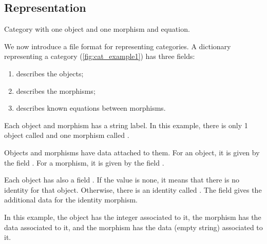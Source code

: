 \vfill
\begin{widepar}
\end{widepar}
\vfill

\clearpage

\subsection{Representation}

\begin{marginfigure}
    \caption{Category with one object and one morphism and equation.}
\end{marginfigure}

We now introduce a file format for representing categories.
A dictionary representing a category (\cref{fig:cat_example1}) has three fields:
\begin{enumerate}
    \item {} describes the objects;
    \item {} describes the morphisms;
    \item {} describes known equations between morphisms.
\end{enumerate}
Each object and morphism has a string label.
In this example, there is only 1 object called 
and one morphism called .

Objects and morphisms have data attached to them.
For an object, it is given by the field .
For a morphism, it is given by the field .

Each object has also a field .
If the value is none, it means that there is no identity for that object.
Otherwise, there is an identity called . The field  gives the additional data for the identity morphism.

In this example, the object  has the integer  associated to it, the morphism  has the data  associated to it, and the morphism  has the data  (empty string) associated to it.

